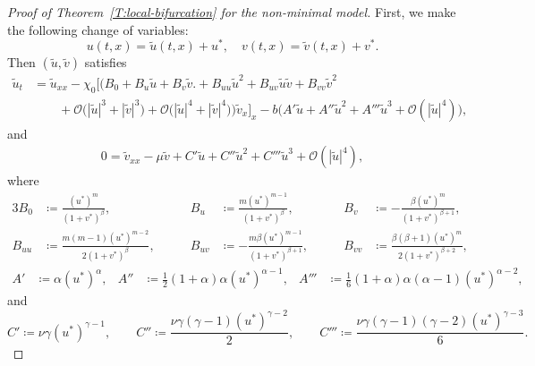 \documentclass[11pt]{article} %
\theoremstyle{remark}
\theoremstyle{remark}
\numberwithin{equation}{section}
\numberwithin{figure}{section}
\numberwithin{table}{section}
\begin{document}
\begin{proof}[Proof of Theorem~\ref{T:local-bifurcation}  for the non-minimal model]
  First, we make the following change of variables:
  \[
    u(t,x)=\tilde{u}(t,x)+u^*,\quad v(t,x)=\tilde{v}(t,x)+v^*.
  \]
  Then $(\tilde{u},\tilde{v})$ satisfies
  \begin{align}\label{E:local-bifurcation-eq2}
    \tilde{u}_t
    & = \tilde{u}_{xx}
    - \chi_0\Big[\Big( B_0
    + B_u\tilde{u}
    + B_v\tilde{v}\Big. \nonumber
    + B_{uu}\tilde{u}^2
    + B_{uv}\tilde{u}\tilde{v}
    + B_{vv}\tilde{v}^2 \nonumber \\
    & \qquad +  {\mathcal{O}\big(|\tilde{u}|^3+|\tilde{v}|^3  \big) }
    + \mathcal{O}\big(|\tilde{u}|^4+|\tilde{v}|^4\big)\Big)\tilde{v}_x\Big]_x  -
    b\Big( A'\tilde{u}
    + A''\tilde{u}^2  + A'''\tilde{u}^3
    + \mathcal{O}(|\tilde{u}|^4)\Big),
  \end{align}
  and
  \begin{align}\label{E:local-bifurcation-eq3}
    0 = \tilde{v}_{xx} - \mu\tilde{v} + C'\tilde{u} +  C'' \tilde{u}^2
    + C'''\tilde{u}^3
    + \mathcal{O}(|\tilde{u}|^4),
  \end{align}
  where
  \begin{alignat}{3}
    B_0 & \coloneqq \frac{(u^*)^m}{(1+v^*)^\beta}, & \qquad B_u & \coloneqq
    \frac{m(u^*)^{m-1}}{(1+v^*)^\beta}, & \qquad B_v & \coloneqq
    -\frac{\beta(u^*)^m}{(1+v^*)^{\beta+1}}, \label{E:B0-Bu-Bv-eq} \\[6pt]
    B_{uu} & \coloneqq \frac{m(m-1)(u^*)^{m-2}}{2(1+v^*)^\beta}, & \qquad
    B_{uv} & \coloneqq -\frac{m\beta(u^*)^{m-1}}{(1+v^*)^{\beta+1}}, & \qquad
    B_{vv} & \coloneqq \frac{\beta(\beta+1)(u^*)^m}{2(1+v^*)^{\beta+2}},
    \label{E:Buu-Buv-Bvv-eq}
  \end{alignat}
  \begin{align}\label{E:L1-L2-eq}
    A' & \coloneqq \alpha(u^*)^\alpha,
    & A''  & \coloneqq \tfrac{1}{2}(1+\alpha)\alpha(u^*)^{\alpha-1},
    & A''' & \coloneqq
    \tfrac{1}{6}(1+\alpha)\alpha(\alpha-1)(u^*)^{\alpha-2},
  \end{align}
  and
  \begin{equation}\label{E:C-const}
    C' \coloneqq \nu\gamma(u^*)^{\gamma-1}, \qquad
    C'' \coloneqq \frac{\nu\gamma(\gamma-1)(u^*)^{\gamma-2}}{2}, \qquad
    C''' \coloneqq \frac{\nu\gamma(\gamma-1)(\gamma-2)(u^*)^{\gamma-3}}{6}.
  \end{equation}

\end{proof}
\end{document}
